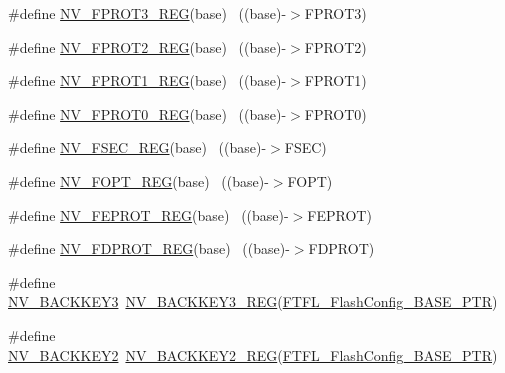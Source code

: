 \begin{DoxyCompactItemize}
\item 
\#define \hyperlink{group___n_v___register___accessor___macros_gad8e367bb2e9aae8570a3736ec8a4aee9}{N\+V\+\_\+\+F\+P\+R\+O\+T3\+\_\+\+R\+EG}(base)                                        ~((base)-\/$>$F\+P\+R\+O\+T3)
\item 
\#define \hyperlink{group___n_v___register___accessor___macros_gae06ab638a7b4ad4757c89118971127d0}{N\+V\+\_\+\+F\+P\+R\+O\+T2\+\_\+\+R\+EG}(base)                                        ~((base)-\/$>$F\+P\+R\+O\+T2)
\item 
\#define \hyperlink{group___n_v___register___accessor___macros_ga1f9fafcb15ed5d1b27020f5b04edfe00}{N\+V\+\_\+\+F\+P\+R\+O\+T1\+\_\+\+R\+EG}(base)                                        ~((base)-\/$>$F\+P\+R\+O\+T1)
\item 
\#define \hyperlink{group___n_v___register___accessor___macros_ga04dc6fb630cffc56b5fff1847704cc53}{N\+V\+\_\+\+F\+P\+R\+O\+T0\+\_\+\+R\+EG}(base)                                        ~((base)-\/$>$F\+P\+R\+O\+T0)
\item 
\#define \hyperlink{group___n_v___register___accessor___macros_gafcfd540f11abf7f4644b7c5a5bc272fe}{N\+V\+\_\+\+F\+S\+E\+C\+\_\+\+R\+EG}(base)                                            ~((base)-\/$>$F\+S\+EC)
\item 
\#define \hyperlink{group___n_v___register___accessor___macros_ga66cb061090c7bd7c8b2447b133a93ce5}{N\+V\+\_\+\+F\+O\+P\+T\+\_\+\+R\+EG}(base)                                            ~((base)-\/$>$F\+O\+PT)
\item 
\#define \hyperlink{group___n_v___register___accessor___macros_ga689f6db632fecfda17b3a0af63529b29}{N\+V\+\_\+\+F\+E\+P\+R\+O\+T\+\_\+\+R\+EG}(base)                                        ~((base)-\/$>$F\+E\+P\+R\+OT)
\item 
\#define \hyperlink{group___n_v___register___accessor___macros_ga8c387944c38c4df1397982458df8a2f1}{N\+V\+\_\+\+F\+D\+P\+R\+O\+T\+\_\+\+R\+EG}(base)                                        ~((base)-\/$>$F\+D\+P\+R\+OT)
\item 
\#define \hyperlink{group___n_v___register___accessor___macros_ga18932af5b184d02998db112b364e45e1}{N\+V\+\_\+\+B\+A\+C\+K\+K\+E\+Y3}~\hyperlink{group___n_v___register___accessor___macros_ga3f3d8bddafcafafb27fb8981656492e1}{N\+V\+\_\+\+B\+A\+C\+K\+K\+E\+Y3\+\_\+\+R\+EG}(\hyperlink{group___n_v___peripheral_gad199a235b90fe3e6afb977f2d6a9c565}{F\+T\+F\+L\+\_\+\+Flash\+Config\+\_\+\+B\+A\+S\+E\+\_\+\+P\+TR})
\item 
\#define \hyperlink{group___n_v___register___accessor___macros_ga51642a3d84acba43ff0aa3925226ab32}{N\+V\+\_\+\+B\+A\+C\+K\+K\+E\+Y2}~\hyperlink{group___n_v___register___accessor___macros_gaad90d55fc5c046a8e8508b04cbe2fbbb}{N\+V\+\_\+\+B\+A\+C\+K\+K\+E\+Y2\+\_\+\+R\+EG}(\hyperlink{group___n_v___peripheral_gad199a235b90fe3e6afb977f2d6a9c565}{F\+T\+F\+L\+\_\+\+Flash\+Config\+\_\+\+B\+A\+S\+E\+\_\+\+P\+TR})

\end{DoxyCompactItemize}
